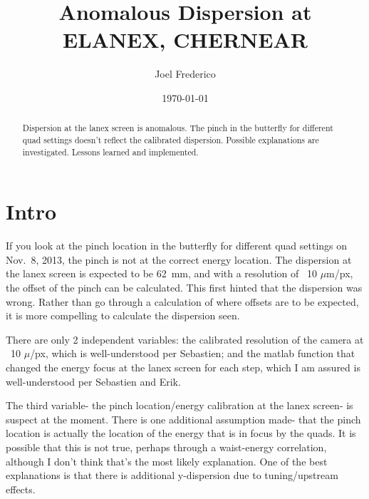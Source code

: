 \documentclass[aps,prl,twocolumn,groupedaddress]{revtex4}
\begin{document}

\title{Anomalous Dispersion at ELANEX, CHERNEAR}

\author{Joel Frederico}


\date{\today}

\begin{abstract}
Dispersion at the lanex screen is anomalous.  The pinch in the butterfly for different quad settings doesn't reflect the calibrated dispersion.  Possible explanations are investigated.  Lessons learned and implemented.
\end{abstract}

\maketitle

\section{Intro}

If you look at the pinch location in the butterfly for different quad settings on Nov.~8, 2013, the pinch is not at the correct energy location.  The dispersion at the lanex screen is expected to be 62~mm, and with a resolution of ~10 $\mu$m/px, the offset of the pinch can be calculated.  This first hinted that the dispersion was wrong.  Rather than go through a calculation of where offsets are to be expected, it is more compelling to calculate the dispersion seen.

There are only 2 independent variables: the calibrated resolution of the camera at ~10 $\mu$/px, which is well-understood per Sebastien; and the matlab function that changed the energy focus at the lanex screen for each step, which I am assured is well-understood per Sebastien and Erik.

The third variable- the pinch location/energy calibration at the lanex screen- is suspect at the moment.  There is one additional assumption made- that the pinch location is actually the location of the energy that is in focus by the quads.  It is possible that this is not true, perhaps through a waist-energy correlation, although I don't think that's the most likely explanation.  One of the best explanations is that there is additional y-dispersion due to tuning/upstream effects.
\end{document}
